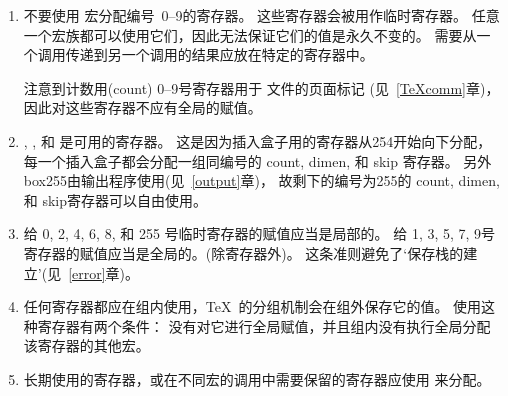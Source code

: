 \documentclass{book}
\begin{document}
\begin{enumerate}
\item 不要使用  宏分配编号~0--9的寄存器。
这些寄存器会被用作临时寄存器。
任意一个宏族都可以使用它们，因此无法保证它们的值是永久不变的。
需要从一个调用传递到另一个调用的结果应放在特定的寄存器中。

注意到计数用(count) 0--9号寄存器用于  文件的页面标记
(见~\ref{TeXcomm}章)，因此对这些寄存器不应有全局的赋值。

\item {}, , 和  是可用的寄存器。
这是因为插入盒子用的寄存器从254开始向下分配，
每一个插入盒子都会分配一组同编号的 count, dimen, 和 skip 寄存器。
另外box255由输出程序使用(见~\ref{output}章)，
故剩下的编号为255的 count, dimen, 和 skip寄存器可以自由使用。

\item 给 0, 2, 4, 6, 8, 和 255 号临时寄存器的赋值应当是局部的。
给 1, 3, 5, 7, 9号寄存器的赋值应当是全局的。(除寄存器外)。
这条准则避免了‘保存栈的建立’(见~\ref{error}章)。

\item 任何寄存器都应在组内使用，\TeX\ 的分组机制会在组外保存它的值。
使用这种寄存器有两个条件：
没有对它进行全局赋值，并且组内没有执行全局分配该寄存器的其他宏。

\item 长期使用的寄存器，或在不同宏的调用中需要保留的寄存器应使用  来分配。
\end{enumerate}

\endofchapter
\end{document}
